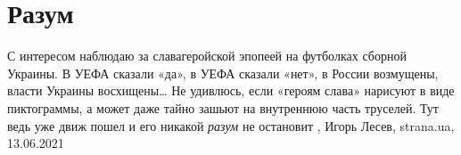  
 
 
 
 
\chapter{Разум}

С интересом наблюдаю за славагеройской эпопеей на футболках сборной Украины. В
УЕФА сказали «да», в УЕФА сказали «нет», в России возмущены, власти Украины
восхищены… Не удивлюсь, если «героям слава» нарисуют в виде пиктограммы, а
может даже тайно зашьют на внутреннюю часть труселей. Тут ведь уже движ пошел и
его никакой \emph{разум} не остановит
, 
Игорь Лесев, strana.ua, 13.06.2021

